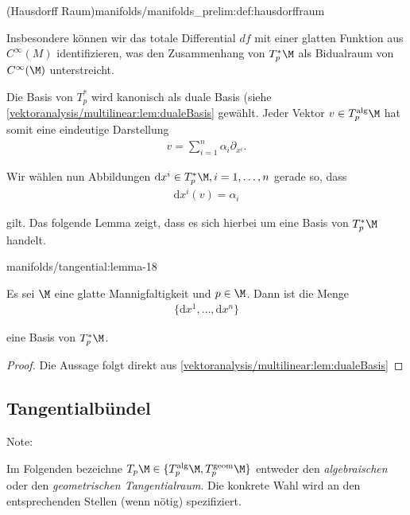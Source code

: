 \documentclass[letterpaper,10pt,english]{jupyterBook}
\begin{document}
\begin{definition}{(Hausdorff Raum)}{manifolds/manifolds_prelim:def:hausdorffraum}
\par
Insbesondere können wir das totale Differential \(df\) mit einer glatten Funktion aus \(C^\infty(M)\) identifizieren, was den Zusammenhang von \(T^\ast_p \M\) als Bidualraum von \(C^\infty(\M)\) unterstreicht.

\par
Die Basis von \(T^\ast_p\) wird kanonisch als duale Basis (siehe \cref{vektoranalysis/multilinear:lem:dualeBasis}  gewählt.
Jeder Vektor \(v\in T_p^{\text{alg}}\M\) hat somit eine eindeutige Darstellung
\begin{align*}
v = \sum_{i=1}^n \alpha_i \partial_{x^i}.
\end{align*}
\par
Wir wählen nun Abbildungen \(\mathrm{d}x^i\in T^\ast_p\M, i=1,\ldots,n\) gerade so, dass
\begin{align*}
\mathrm{d}x^i(v) = \alpha_i
\end{align*}
\par
gilt.
Das folgende Lemma zeigt, dass es sich hierbei um eine Basis von \(T^\ast_p\M\) handelt.
\begin{lemma}{}{manifolds/tangential:lemma-18}



\par
Es sei \(\M\) eine glatte Mannigfaltigkeit und \(p\in\M\).
Dann ist die Menge
\begin{align*}
\{\mathrm{d}x^1,\ldots, \mathrm{d}x^n\}
\end{align*}
\par
eine Basis von \(T_p^\ast\M\).
\end{lemma}

\begin{proof}
 Die Aussage folgt direkt aus \cref{vektoranalysis/multilinear:lem:dualeBasis} 
\end{proof}


\subsection{Tangentialbündel}
\label{\detokenize{manifolds/tangential:tangentialbundel}}
\begin{emphBox}{}{}{Note:}
\par
Im Folgenden bezeichne \(T_p\M\in\{T^{\text{alg}}_p\M, T^{\text{geom}}_p\M \}\) entweder den \emph{algebraischen} oder den \emph{geometrischen Tangentialraum}.
Die konkrete Wahl wird an den entsprechenden Stellen (wenn nötig) spezifiziert.
\end{emphBox}


\end{definition}
\end{document}

